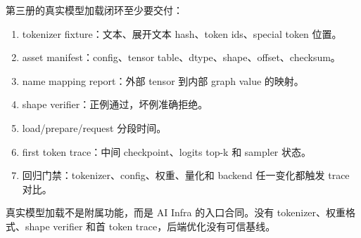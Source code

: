 第三册的真实模型加载闭环至少要交付：

\begin{enumerate}
  \item tokenizer fixture：文本、展开文本 hash、token ids、special token 位置。
  \item asset manifest：config、tensor table、dtype、shape、offset、checksum。
  \item name mapping report：外部 tensor 到内部 graph value 的映射。
  \item shape verifier：正例通过，坏例准确拒绝。
  \item load/prepare/request 分段时间。
  \item first token trace：中间 checkpoint、logits top-k 和 sampler 状态。
  \item 回归门禁：tokenizer、config、权重、量化和 backend 任一变化都触发 trace 对比。
\end{enumerate}

\begin{keyidea}
真实模型加载不是附属功能，而是 AI Infra 的入口合同。没有 tokenizer、权重格式、shape verifier 和首 token trace，后端优化没有可信基线。
\end{keyidea}
